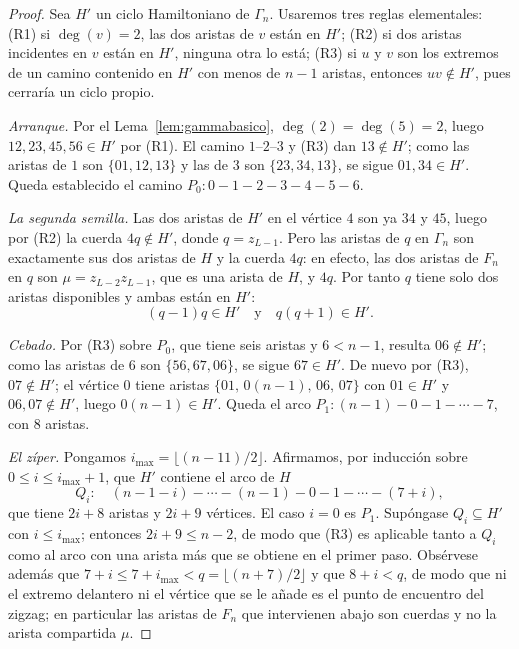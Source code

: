 \documentclass[11pt,a4paper]{article}
\theoremstyle{definition}
\theoremstyle{remark}
\begin{document}
\begin{proof}
Sea $H'$ un ciclo Hamiltoniano de $\Gamma_n$. Usaremos tres reglas elementales: (R1) si $\deg(v)=2$, las dos aristas de $v$ están en $H'$; (R2) si dos aristas incidentes en $v$ están en $H'$, ninguna otra lo está; (R3) si $u$ y $v$ son los extremos de un camino contenido en $H'$ con menos de $n-1$ aristas, entonces $uv\notin H'$, pues cerraría un ciclo propio.

\emph{Arranque.} Por el Lema~\ref{lem:gammabasico}, $\deg(2)=\deg(5)=2$, luego $12,23,45,56\in H'$ por (R1). El camino $1$--$2$--$3$ y (R3) dan $13\notin H'$; como las aristas de $1$ son $\{01,12,13\}$ y las de $3$ son $\{23,34,13\}$, se sigue $01,34\in H'$. Queda establecido el camino $P_0:0-1-2-3-4-5-6$.

\emph{La segunda semilla.} Las dos aristas de $H'$ en el vértice $4$ son ya $34$ y $45$, luego por (R2) la cuerda $4q\notin H'$, donde $q=z_{L-1}$. Pero las aristas de $q$ en $\Gamma_n$ son exactamente sus dos aristas de $H$ y la cuerda $4q$: en efecto, las dos aristas de $F_n$ en $q$ son $\mu=z_{L-2}z_{L-1}$, que es una arista de $H$, y $4q$. Por tanto $q$ tiene solo dos aristas disponibles y ambas están en $H'$:
\begin{equation}\label{eq:semilla2}
(q-1)q\in H'\quad\text{y}\quad q(q+1)\in H'.
\end{equation}

\emph{Cebado.} Por (R3) sobre $P_0$, que tiene seis aristas y $6<n-1$, resulta $06\notin H'$; como las aristas de $6$ son $\{56,67,06\}$, se sigue $67\in H'$. De nuevo por (R3), $07\notin H'$; el vértice $0$ tiene aristas $\{01,\,0(n{-}1),\,06,\,07\}$ con $01\in H'$ y $06,07\notin H'$, luego $0(n{-}1)\in H'$. Queda el arco $P_1:(n-1)-0-1-\cdots-7$, con $8$ aristas.

\emph{El zíper.} Pongamos $i_{\max}=\lfloor (n-11)/2\rfloor$. Afirmamos, por inducción sobre $0\le i\le i_{\max}+1$, que $H'$ contiene el arco de $H$
\[
Q_i:\quad (n-1-i)-\cdots-(n-1)-0-1-\cdots-(7+i),
\]
que tiene $2i+8$ aristas y $2i+9$ vértices. El caso $i=0$ es $P_1$. Supóngase $Q_i\subseteq H'$ con $i\le i_{\max}$; entonces $2i+9\le n-2$, de modo que (R3) es aplicable tanto a $Q_i$ como al arco con una arista más que se obtiene en el primer paso. Obsérvese además que $7+i\le 7+i_{\max}<q=\lfloor (n+7)/2\rfloor$ y que $8+i<q$, de modo que ni el extremo delantero ni el vértice que se le añade es el punto de encuentro del zigzag; en particular las aristas de $F_n$ que intervienen abajo son cuerdas y no la arista compartida $\mu$.


\end{proof}
\end{document}
